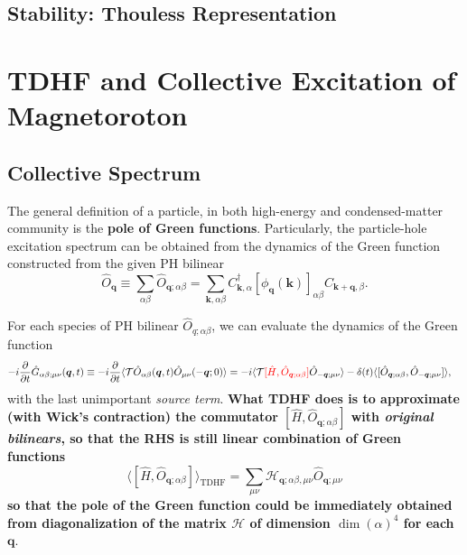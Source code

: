 \documentclass[aps,prb,nofootinbib,reprint,onecolumn]{revtex4-2}
\begin{document}
	\subsection{Stability: Thouless Representation}

\section{TDHF and Collective Excitation of Magnetoroton}
	\subsection{Collective Spectrum}
		The general definition of a particle, in both high-energy and condensed-matter community is the \textbf{pole of Green functions}. Particularly, the particle-hole excitation spectrum can be obtained from the dynamics of the Green function constructed from the given PH bilinear
		\begin{equation}\label{PH bilinear}
			\hat O_{\bm q}\equiv\sum_{\alpha\beta}\hat O_{\bm q;\alpha\beta}=\sum_{\bm k,\alpha\beta}C_{\bm k,\alpha}^\dagger[\phi_{\bm q}(\bm k)]_{\alpha\beta}C_{\bm k+\bm q,\beta}.
		\end{equation}
		
		For each species of PH bilinear $\hat O_{q;\alpha\beta}$, we can evaluate the dynamics of the Green function
		\begin{align*}
			-i\dfrac{\partial }{\partial t}\hat G_{\alpha\beta;\mu\nu}(\bm q,t)&\equiv-i\dfrac{\partial }{\partial t}\langle\mathcal T\hat O_{\alpha\beta}(\bm q,t)\hat O_{\mu\nu}(-\bm q;0)\rangle=-i\langle\mathcal T{\color{red}[\hat H,\hat O_{\bm q;\alpha\beta}]}\hat O_{-\bm q;\mu\nu}\rangle-\delta(t)\langle[\hat O_{\bm q;\alpha\beta},\hat O_{-\bm q;\mu\nu}]\rangle,
		\end{align*}
		with the last unimportant \emph{source term}. \textbf{What TDHF does is to approximate (with Wick's contraction) the commutator $[\hat H,\hat O_{\bm q;\alpha\beta}]$ with \emph{original bilinears}, so that the RHS is still linear combination of Green functions}
		\begin{equation*}
			\langle[\hat H,\hat O_{\bm q;\alpha\beta}]\rangle_{\text{TDHF}}=\sum_{\mu\nu}\mathcal H_{\bm q;\alpha\beta,\mu\nu}\hat O_{\bm q;\mu\nu}
		\end{equation*}
		\textbf{so that the pole of the Green function could be immediately obtained from diagonalization of the matrix $\mathcal H$ of dimension $\dim(\alpha)^4$ for each $\bm q$}.




\end{document}
